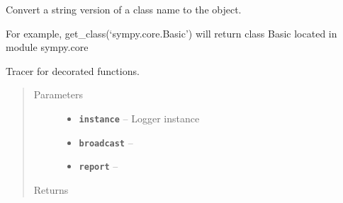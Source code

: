 \documentclass[letterpaper,10pt,english]{sphinxmanual}
\begin{document}

\begin{fulllineitems}
\label{RRtoolbox.lib:RRtoolbox.lib.inspector.funcData}
\end{fulllineitems}


\begin{fulllineitems}
\label{RRtoolbox.lib:RRtoolbox.lib.inspector.load}
Convert a string version of a class name to the object.

For example, get\_class(`sympy.core.Basic') will return
class Basic located in module sympy.core

\end{fulllineitems}


\begin{fulllineitems}
\label{RRtoolbox.lib:RRtoolbox.lib.inspector.reloadFunc}
\end{fulllineitems}


\begin{fulllineitems}
\label{RRtoolbox.lib:RRtoolbox.lib.inspector.tracer}
Tracer for decorated functions.
\begin{quote}\begin{description}
\item[{Parameters}] \leavevmode\begin{itemize}
\item {} 
\textbf{\texttt{instance}} -- Logger instance

\item {} 
\textbf{\texttt{broadcast}} -- 

\item {} 
\textbf{\texttt{report}} -- 

\end{itemize}

\item[{Returns}] \leavevmode


\end{description}\end{quote}

\end{fulllineitems}
\end{document}
